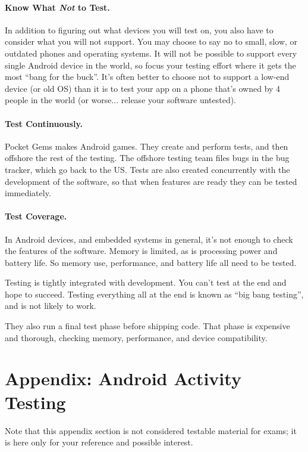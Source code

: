 \paragraph{Know What \emph{Not} to Test.} In addition to figuring out what devices you will test on, you also have to consider what you will not support. You may choose to say no to small, slow, or outdated phones and operating systems. It will not be possible to support every single Android device in the world, so focus your testing effort where it gets the most ``bang for the buck''. It's often better to choose not to support a low-end device (or old OS) than it is to test your app on a phone that's owned by 4 people in the world (or worse... release your software untested).

\paragraph{Test Continuously.} Pocket Gems makes Android games. They create
and perform tests, and then offshore the rest of the testing. The offshore 
testing team files bugs in the bug tracker, which go back to the US. Tests are also created concurrently with the development of the software, so that when features are ready they can be tested immediately.

\paragraph{Test Coverage.} In Android devices, and embedded systems in general, it's not enough to check the features of the software. Memory is limited, as is processing power and battery life. So memory use, performance, and battery life all need to be tested.

Testing is tightly integrated with development. You can't test at the end
and hope to succeed. Testing everything all at the end is known as ``big bang testing'', and is not likely to work.

They also run a final test phase before shipping code. That phase is expensive
and thorough, checking memory, performance, and device compatibility.




\section*{Appendix: Android Activity Testing}

Note that this appendix section is not considered testable material for exams; it is here only for your reference and possible interest.

